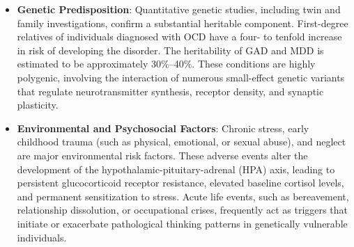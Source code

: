 \begin{itemize}
  \item \textbf{Genetic Predisposition}: Quantitative genetic studies, including twin and family investigations, confirm a substantial heritable component. First-degree relatives of individuals diagnosed with OCD have a four- to tenfold increase in risk of developing the disorder. The heritability of GAD and MDD is estimated to be approximately 30\%--40\%. These conditions are highly polygenic, involving the interaction of numerous small-effect genetic variants that regulate neurotransmitter synthesis, receptor density, and synaptic plasticity.
  \item \textbf{Environmental and Psychosocial Factors}: Chronic stress, early childhood trauma (such as physical, emotional, or sexual abuse), and neglect are major environmental risk factors. These adverse events alter the development of the hypothalamic-pituitary-adrenal (HPA) axis, leading to persistent glucocorticoid receptor resistance, elevated baseline cortisol levels, and permanent sensitization to stress. Acute life events, such as bereavement, relationship dissolution, or occupational crises, frequently act as triggers that initiate or exacerbate pathological thinking patterns in genetically vulnerable individuals.
\end{itemize}

